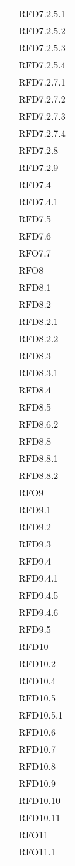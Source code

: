 \begin{longtable}{|>{\centering}m{10cm}|m{3cm}<{\centering}|}
& RFD7.2.5.1\\
& RFD7.2.5.2\\
& RFD7.2.5.3\\
& RFD7.2.5.4\\
& RFD7.2.7.1\\
& RFD7.2.7.2\\
& RFD7.2.7.3\\
& RFD7.2.7.4\\
& RFD7.2.8\\
& RFD7.2.9\\
& RFD7.4\\
& RFD7.4.1\\
& RFD7.5\\
& RFD7.6\\
& RFO7.7\\
& RFO8\\
& RFD8.1\\
& RFD8.2\\
& RFD8.2.1\\
& RFD8.2.2\\
& RFD8.3\\
& RFD8.3.1\\
& RFD8.4\\
& RFD8.5\\
& RFD8.6.2\\
& RFD8.8\\
& RFD8.8.1\\
& RFD8.8.2\\
& RFO9\\
& RFD9.1\\
& RFD9.2\\
& RFD9.3\\
& RFD9.4\\
& RFD9.4.1\\
& RFD9.4.5\\
& RFD9.4.6\\
& RFD9.5\\
& RFD10\\
& RFD10.2\\
& RFD10.4\\
& RFD10.5\\
& RFD10.5.1\\
& RFD10.6\\
& RFD10.7\\
& RFD10.8\\
& RFD10.9\\
& RFD10.10\\
& RFD10.11\\
& RFO11\\
& RFO11.1\\

\end{longtable}
